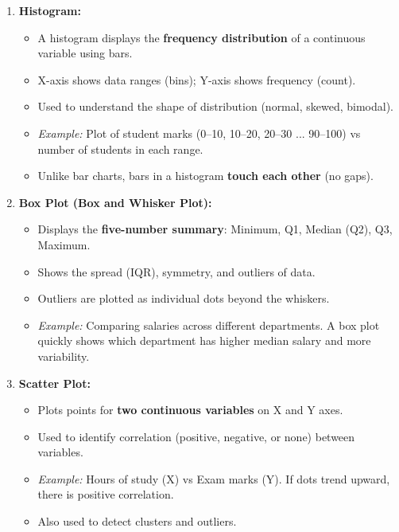 \documentclass[12pt,a4paper]{article}
\newcommand{\term}[1]{\textbf{\color{headingcolor}#1}}
\begin{document}
\begin{answerenv}

\begin{enumerate}[leftmargin=1.8em, itemsep=8pt]
  \item \term{Histogram:}
  \begin{itemize}[leftmargin=1.5em, itemsep=2pt]
    \item A histogram displays the \textbf{frequency distribution} of a continuous variable using bars.
    \item X-axis shows data ranges (bins); Y-axis shows frequency (count).
    \item Used to understand the shape of distribution (normal, skewed, bimodal).
    \item \textit{Example:} Plot of student marks (0--10, 10--20, 20--30 ... 90--100) vs number of students in each range.
    \item Unlike bar charts, bars in a histogram \textbf{touch each other} (no gaps).
  \end{itemize}

  \item \term{Box Plot (Box and Whisker Plot):}
  \begin{itemize}[leftmargin=1.5em, itemsep=2pt]
    \item Displays the \textbf{five-number summary}: Minimum, Q1, Median (Q2), Q3, Maximum.
    \item Shows the spread (IQR), symmetry, and outliers of data.
    \item Outliers are plotted as individual dots beyond the whiskers.
    \item \textit{Example:} Comparing salaries across different departments. A box plot quickly shows which department has higher median salary and more variability.
  \end{itemize}

  \item \term{Scatter Plot:}
  \begin{itemize}[leftmargin=1.5em, itemsep=2pt]
    \item Plots points for \textbf{two continuous variables} on X and Y axes.
    \item Used to identify correlation (positive, negative, or none) between variables.
    \item \textit{Example:} Hours of study (X) vs Exam marks (Y). If dots trend upward, there is positive correlation.
    \item Also used to detect clusters and outliers.
  \end{itemize}
\end{enumerate}


\end{answerenv}
\end{document}
